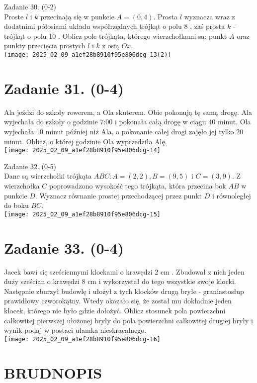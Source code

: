 \documentclass[10pt]{article}
\begin{document}
Zadanie 30. (0-2)\\
Proste \(l\) i \(k\) przecinają się w punkcie \(A=(0,4)\). Prosta \(l\) wyznacza wraz z dodatnimi półosiami układu współrzędnych trójkąt o polu 8 , zaś prosta \(k\) - trójkąt o polu 10 . Oblicz pole trójkąta, którego wierzchołkami są: punkt \(A\) oraz punkty przecięcia prostych \(l\) i \(k\) z osią \(O x\).\\
\texttt{[image: 2025\_02\_09\_a1ef28b8910f95e806dcg-13(2)]}

\section*{Zadanie 31. (0-4)}
Ala jeździ do szkoły rowerem, a Ola skuterem. Obie pokonują tę samą drogę. Ala wyjechała do szkoły o godzinie 7:00 i pokonała całą drogę w ciągu 40 minut. Ola wyjechała 10 minut później niż Ala, a pokonanie całej drogi zajęło jej tylko 20 minut. Oblicz, o której godzinie Ola wyprzedziła Alę.\\
\texttt{[image: 2025\_02\_09\_a1ef28b8910f95e806dcg-14]}

Zadanie 32. (0-5)\\
Dane są wierzchołki trójkąta \(A B C: A=(2,2), B=(9,5)\) i \(C=(3,9)\). Z wierzchołka \(C\) poprowadzono wysokość tego trójkąta, która przecina bok \(A B\) w punkcie \(D\). Wyznacz równanie prostej przechodzącej przez punkt \(D\) i równoległej do boku \(B C\).\\
\texttt{[image: 2025\_02\_09\_a1ef28b8910f95e806dcg-15]}

\section*{Zadanie 33. (0-4)}
Jacek bawi się sześciennymi klockami o krawędzi 2 cm . Zbudował z nich jeden duży sześcian o krawędzi 8 cm i wykorzystał do tego wszystkie swoje klocki. Następnie zburzył budowlę i ułożył z tych klocków drugą bryłe - graniastosłup prawidłowy czworokątny. Wtedy okazało się, że został mu dokładnie jeden klocek, którego nie było gdzie dołożyć. Oblicz stosunek pola powierzchni całkowitej pierwszej ułożonej bryły do pola powierzchni całkowitej drugiej bryły i wynik podaj w postaci ułamka nieskracalnego.\\
\texttt{[image: 2025\_02\_09\_a1ef28b8910f95e806dcg-16]}

\section*{BRUDNOPIS}
\end{document}
